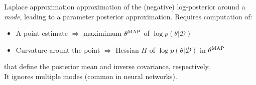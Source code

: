 \documentclass{beamer}
\begin{document}
\begin{frame}{Laplace approximation}
 approximation of the (negative) log-posterior around a \emph{mode}, leading to a  parameter posterior approximation.
Requires computation of:
\begin{itemize}
  \item A point estimate $\Rightarrow$  maximimum $\theta^{\rm MAP}$ of $\log p(\theta | \mathcal{D})$
  \item Curvature arount the point $\Rightarrow$ Hessian $H$ of $\log p(\theta | \mathcal{D})$ in $\theta^{\rm MAP}$
  \end{itemize}
that define the posterior mean and inverse covariance, respectively.
  \pause \\
It \alert{ignores multiple modes}  (common in neural networks).
\end{frame} 
\end{document}
